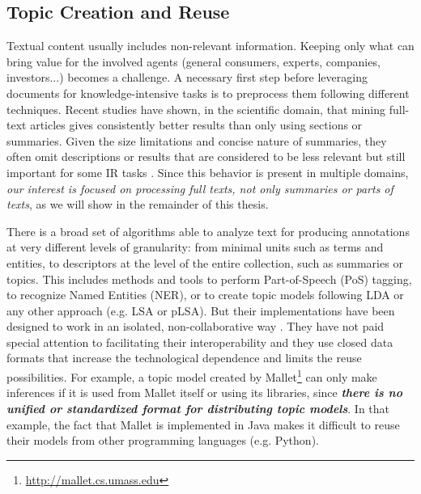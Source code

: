 \subsection{Topic Creation and Reuse}
\label{sec:topic-reuse}

Textual content usually includes non-relevant information. Keeping only what can bring value for the involved agents (general consumers, experts, companies, investors...) becomes a challenge. A necessary first step before leveraging documents for knowledge-intensive tasks is to preprocess them following different techniques. Recent studies \citep{Westergaard2017} have shown, in the scientific domain, that mining full-text articles gives consistently better results than only using sections or summaries. Given the size limitations and concise nature of summaries, they often omit descriptions or results that are considered to be less relevant but still important for some IR tasks \citep{Divoli2012}.  Since this behavior is present in multiple domains, \textit{our interest is focused on processing full texts, not only summaries or parts of texts}, as we will show in the remainder of this thesis.

There is a broad set of algorithms able to analyze text for producing annotations at very different levels of granularity: from minimal units such as terms and entities, to descriptors at the level of the entire collection, such as summaries or topics. This includes methods and tools to perform Part-of-Speech (PoS) tagging, to recognize Named Entities (NER), or to create topic models following LDA or any other approach (e.g. LSA or pLSA). But their implementations have been designed to work in an isolated, non-collaborative way \citep{Manning2014TheToolkit, Agerri2014}. They have not paid special attention to facilitating their interoperability and they use closed data formats that increase the technological dependence and limits the reuse possibilities. For example, a topic model created by Mallet\footnote{\url{http://mallet.cs.umass.edu}} can only make inferences if it is used from Mallet itself or using its libraries, since \textbf{\textit{there is no unified or standardized format for distributing topic models}}. In that example, the fact that Mallet is implemented in Java makes it difficult to reuse their models from other programming languages (e.g. Python).

